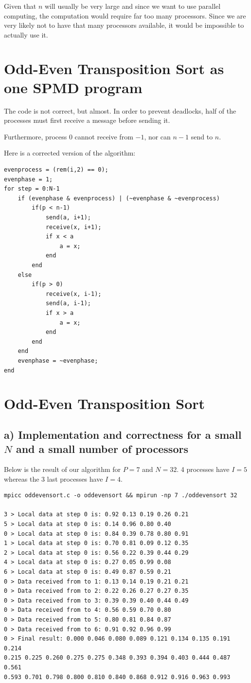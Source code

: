 Given that $n$ will usually be very large and since we want to use parallel computing, the computation would require far too many processors. Since we are very likely not to have that many processors available, it would be impossible to actually use it.


\section{Odd-Even Transposition Sort as one SPMD program}

The code is not correct, but almost. In order to prevent deadlocks, half of the processes must first receive a message before sending it.

Furthermore, process $0$ cannot receive from $-1$, nor can $n-1$ send to $n$.

Here is a corrected version of the algorithm:

\begin{lstlisting}
evenprocess = (rem(i,2) == 0);
evenphase = 1;
for step = 0:N-1
    if (evenphase & evenprocess) | (~evenphase & ~evenprocess)
        if(p < n-1)
            send(a, i+1);
            receive(x, i+1);
            if x < a
                a = x;
            end
        end
    else
        if(p > 0)
            receive(x, i-1);
            send(a, i-1);
            if x > a
                a = x;
            end
        end
    end
    evenphase = ~evenphase;
end
\end{lstlisting}


\section{Odd-Even Transposition Sort}
\subsection*{a) Implementation and correctness for a small $N$ and a small number of processors}
Below is the result of our algorithm for $P = 7$ and $N = 32$. 4 processes have $I = 5$ whereas the 3 last processes have $I = 4$.

\begin{verbatim}
mpicc oddevensort.c -o oddevensort && mpirun -np 7 ./oddevensort 32

3 > Local data at step 0 is: 0.92 0.13 0.19 0.26 0.21 
5 > Local data at step 0 is: 0.14 0.96 0.80 0.40 
0 > Local data at step 0 is: 0.84 0.39 0.78 0.80 0.91 
1 > Local data at step 0 is: 0.70 0.81 0.09 0.12 0.35 
2 > Local data at step 0 is: 0.56 0.22 0.39 0.44 0.29 
4 > Local data at step 0 is: 0.27 0.05 0.99 0.08 
6 > Local data at step 0 is: 0.49 0.87 0.59 0.21 
0 > Data received from to 1: 0.13 0.14 0.19 0.21 0.21 
0 > Data received from to 2: 0.22 0.26 0.27 0.27 0.35 
0 > Data received from to 3: 0.39 0.39 0.40 0.44 0.49 
0 > Data received from to 4: 0.56 0.59 0.70 0.80 
0 > Data received from to 5: 0.80 0.81 0.84 0.87 
0 > Data received from to 6: 0.91 0.92 0.96 0.99 
0 > Final result: 0.000 0.046 0.080 0.089 0.121 0.134 0.135 0.191 0.214
0.215 0.225 0.260 0.275 0.275 0.348 0.393 0.394 0.403 0.444 0.487 0.561
0.593 0.701 0.798 0.800 0.810 0.840 0.868 0.912 0.916 0.963 0.993
\end{verbatim}

